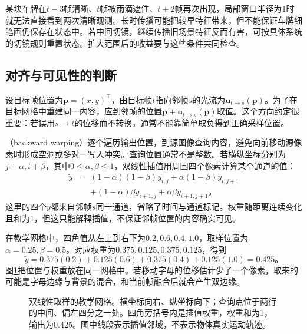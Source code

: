 某块车牌在$t-3$帧清晰、$t$帧被雨滴遮住、$t+2$帧再次出现，局部窗口半径为1时就无法直接看到两次清晰观测。长时传播可能把较早特征带来，但不能保证车牌细笔画仍保存在状态中。若中间切镜，继续传播旧场景特征反而有害，可按具体系统的切镜规则重置状态。扩大范围后的收益要与这些条件共同检查。

\subsection{对齐与可见性的判断}
\label{sec:vision-video-warping}

设目标帧位置为$\bm{p}=(x,y)^\top$，由目标帧$t$指向邻帧$s$的光流为$\bm{u}_{t\to s}(\bm{p})$。为了在目标网格中重建同一内容，应到邻帧的位置$\bm{p}+\bm{u}_{t\to s}(\bm{p})$取值。这个方向约定很重要：若误用$s\to t$的位移而不转换，通常不能靠简单取负得到正确采样位置。

（backward warping）逐个遍历输出位置，到源图像查询内容，避免向前移动源像素时形成空洞或多对一写入冲突。查询位置通常不是整数。若横纵坐标分别为$j+\alpha,i+\beta$，其中$0\leq\alpha,\beta\leq1$，双线性插值用周围四个像素计算某个通道的值：
\begin{equation}
  \begin{aligned}
    \widetilde y={}&(1-\alpha)(1-\beta)y_{i,j}
       +\alpha(1-\beta)y_{i,j+1}\\
       &+(1-\alpha)\beta y_{i+1,j}
       +\alpha\beta y_{i+1,j+1}\text{。}
  \end{aligned}
  \label{eq:vision-video-bilinear}
\end{equation}
这里的四个$y$都来自邻帧$s$同一通道，省略了时间与通道标记。权重随距离连续变化且和为1，但这只能解释插值，不保证邻帧位置的内容确实可见。

在教学网格中，四角值从左上到右下为$0.2,0.6,0.4,1.0$，取样位置为$\alpha=0.25,\beta=0.5$。对应权重为$0.375,0.125,0.375,0.125$，得到
\[
  \widetilde y=0.375(0.2)+0.125(0.6)
       +0.375(0.4)+0.125(1.0)=0.425\text{。}
\]
图\ref{fig:vision-bilinear-warp}把位置与权重放在同一网格中。若移动字母的位移估计少了一个像素，取来的可能是字母边缘与背景的混合，和当前帧融合后就会产生双边缘。

\begin{figure}[htbp]
  \centering
  
  \caption{双线性取样的教学网格。横坐标向右、纵坐标向下；查询点位于两行的中间、偏左四分之一处。四角旁括号内是插值权重，权重和为1，输出为0.425。图中线段表示插值邻域，不表示物体真实运动轨迹。}
  \label{fig:vision-bilinear-warp}
\end{figure}


